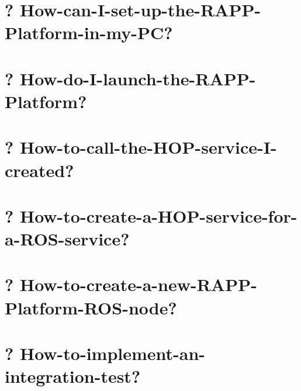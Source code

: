 \documentclass[twoside]{book}
\begin{document}
\chapter{? How-\/can-\/\-I-\/set-\/up-\/the-\/\-R\-A\-P\-P-\/\-Platform-\/in-\/my-\/\-P\-C?}
\label{md_rapp-platform_8wiki_How-can-I-set-up-the-RAPP-Platform-in-my-PC}
\hypertarget{md_rapp-platform_8wiki_How-can-I-set-up-the-RAPP-Platform-in-my-PC}{}

\chapter{? How-\/do-\/\-I-\/launch-\/the-\/\-R\-A\-P\-P-\/\-Platform?}
\label{md_rapp-platform_8wiki_How-do-I-launch-the-RAPP-Platform}
\hypertarget{md_rapp-platform_8wiki_How-do-I-launch-the-RAPP-Platform}{}

\chapter{? How-\/to-\/call-\/the-\/\-H\-O\-P-\/service-\/\-I-\/created?}
\label{md_rapp-platform_8wiki_How-to-call-the-HOP-service-I-created}
\hypertarget{md_rapp-platform_8wiki_How-to-call-the-HOP-service-I-created}{}

\chapter{? How-\/to-\/create-\/a-\/\-H\-O\-P-\/service-\/for-\/a-\/\-R\-O\-S-\/service?}
\label{md_rapp-platform_8wiki_How-to-create-a-HOP-service-for-a-ROS-service}
\hypertarget{md_rapp-platform_8wiki_How-to-create-a-HOP-service-for-a-ROS-service}{}

\chapter{? How-\/to-\/create-\/a-\/new-\/\-R\-A\-P\-P-\/\-Platform-\/\-R\-O\-S-\/node?}
\label{md_rapp-platform_8wiki_How-to-create-a-new-RAPP-Platform-ROS-node}
\hypertarget{md_rapp-platform_8wiki_How-to-create-a-new-RAPP-Platform-ROS-node}{}

\chapter{? How-\/to-\/implement-\/an-\/integration-\/test?}
\label{md_rapp-platform_8wiki_How-to-implement-an-integration-test}
\hypertarget{md_rapp-platform_8wiki_How-to-implement-an-integration-test}{}

\end{document}
